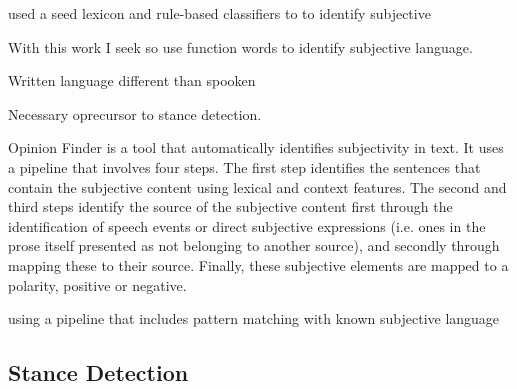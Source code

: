\cite{wiebe2011finding} used a seed lexicon and rule-based classifiers to to identify subjective 


With this work I seek so use function words to identify subjective language. 

Written language different than spooken 

Necessary oprecursor to stance detection. \cite{wiebe2011finding} 
 
Opinion Finder \citep{wilson2005opinionfinder} is a tool that automatically identifies subjectivity in text.  It uses a pipeline that involves four steps.  The first step identifies the sentences that contain the subjective content using lexical and context features.  The second and third steps identify the source of the subjective content first through the identification of speech events or direct subjective expressions (i.e. ones in the prose itself presented as not belonging to another source), and secondly through mapping these to their source.  Finally, these subjective elements are mapped to a polarity, positive or negative.  


using a pipeline that includes pattern matching with known subjective language

\subsection{Stance Detection}



